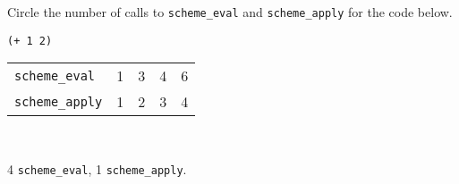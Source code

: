\begin{blocksection}
\question Circle the number of calls to \lstinline$scheme_eval$ and
\lstinline$scheme_apply$ for the code below.

 \begin{lstlisting}
(+ 1 2)
\end{lstlisting}

\begin{tabular}{lrrrr}
\lstinline$scheme_eval$ & 1 & 3 & 4 & 6 \\
\lstinline$scheme_apply$ & 1 & 2 & 3 & 4
\end{tabular}
\\

\begin{solution}
4 \lstinline$scheme_eval$, 1 \lstinline$scheme_apply$.
\end{solution}

\end{blocksection}